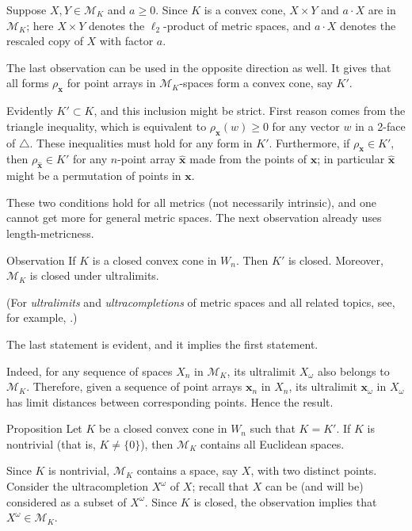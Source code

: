 \documentclass[a4paper,10pt]{article}
\begin{document}
Suppose $X,Y\in  \mathcal{M}_K$ and $a\ge 0$.
Since $K$ is a convex cone,  $X\times Y$ and $a\cdot X$ are in $\mathcal{M}_K$;
here $X\times Y$ denotes the $\ell_2$-product of metric spaces, and
$a\cdot X$ denotes the rescaled copy of $X$ with factor $a$.

The last observation can be used in the opposite direction as well.
It gives that all forms $\rho_{\bm{x}}$ for point arrays in $\mathcal{M}_K$-spaces form a convex cone, say $K'$.

Evidently $K'\subset K$, and this inclusion might be strict.
First reason comes from the triangle inequality, which is equivalent to $\rho_{\bm{x}}(w)\ge 0$ for any vector $w$ in a 2-face of $\triangle$.
These inequalities must hold for any form in $K'$.
Furthermore, if $\rho_{\bm{x}}\in K'$, then $\rho_{\hat{\bm{x}}}\in K'$ for any $n$-point array $\hat{\bm{x}}$ made from the points of $\bm{x}$; in particular $\hat{\bm{x}}$ might be a permutation of points in $\bm{x}$.

These two conditions hold for all metrics (not necessarily intrinsic),
and one cannot get more for general metric spaces.
The next observation already uses length-metricness.

\begin{thm}{Observation}
If $K$ is a closed convex cone in $W_n$.
Then $K'$ is closed.
Moreover, $\mathcal{M}_K$ is closed under ultralimits.
\end{thm}


(For \emph{ultralimits} and \emph{ultracompletions} of metric spaces and all related topics, see, for example, \cite{petrunin2023}.)

The last statement is evident, and it implies the first statement.

Indeed, for any sequence of spaces $X_n$ in $\mathcal{M}_K$, its ultralimit $X_\omega$ also belongs to $\mathcal{M}_K$.
Therefore, given a sequence of point arrays $\bm{x}_n$ in $X_n$,
its ultralimit $\bm{x}_\omega$ in $X_\omega$ has limit distances between corresponding points.
Hence the result.
\qeds

\begin{thm}{Proposition}\label{prop:Associated form}
Let $K$ be a closed convex cone in $W_n$ such that $K=K'$.
If $K$ is nontrivial (that is, $K\ne \{0\}$), then $\mathcal{M}_K$ contains all Euclidean spaces.
\end{thm}

Since $K$ is nontrivial, $\mathcal{M}_K$ contains a space, say $X$, with two distinct points.
Consider the ultracompletion $X^\omega$ of $X$;
recall that $X$ can be (and will be) considered as a subset of $X^\omega$.
Since $K$ is closed, the observation implies that $X^\omega\in \mathcal{M}_K$.
\end{document}
